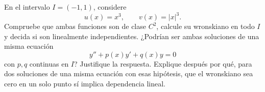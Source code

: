 En el intervalo \(I=(-1,1)\), considere
\[
u(x)=x^3,\qquad v(x)=|x|^3.
\]
Compruebe que ambas funciones son de clase \(C^2\), calcule su wronskiano en todo \(I\) y decida si son linealmente independientes. ¿Podrían ser ambas soluciones de una misma ecuación
\[
y''+p(x)y'+q(x)y=0
\]
con \(p,q\) continuas en \(I\)? Justifique la respuesta. Explique después por qué, para dos soluciones de una misma ecuación con esas hipótesis, que el wronskiano sea cero en un solo punto sí implica dependencia lineal.
